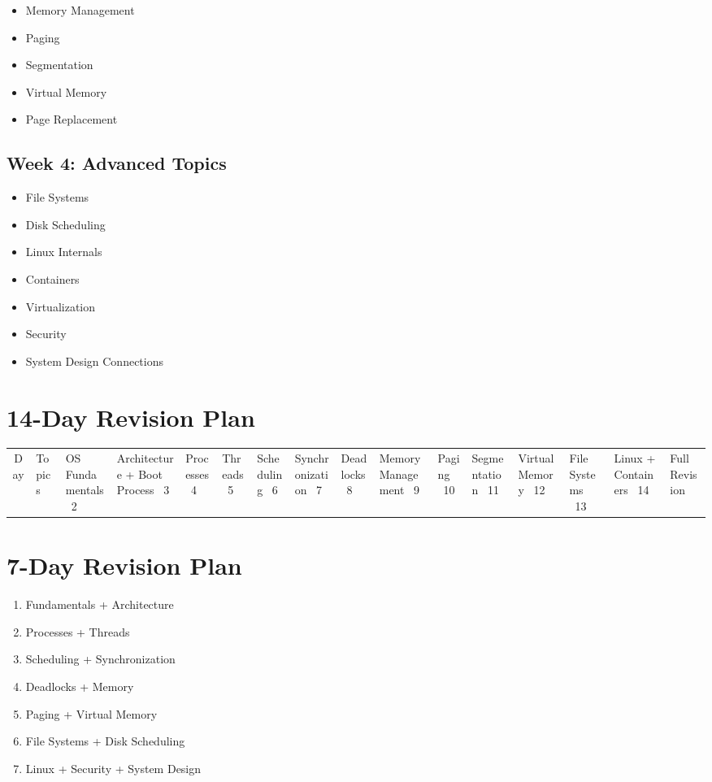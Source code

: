 \begin{itemize}
\item Memory Management
\item Paging
\item Segmentation
\item Virtual Memory
\item Page Replacement
\end{itemize}

\subsection*{Week 4: Advanced Topics}

\begin{itemize}
\item File Systems
\item Disk Scheduling
\item Linux Internals
\item Containers
\item Virtualization
\item Security
\item System Design Connections
\end{itemize}

\section{14-Day Revision Plan}

\begin{center}
\begin{tabular}{|c|l|}
\hline
Day & Topics \
 & OS Fundamentals \
2 & Architecture + Boot Process \
3 & Processes \
4 & Threads \
5 & Scheduling \
6 & Synchronization \
7 & Deadlocks \
8 & Memory Management \
9 & Paging \
10 & Segmentation \
11 & Virtual Memory \
12 & File Systems \
13 & Linux + Containers \
14 & Full Revision \
\hline
\end{tabular}
\end{center}

\section{7-Day Revision Plan}

\begin{enumerate}
\item Fundamentals + Architecture
\item Processes + Threads
\item Scheduling + Synchronization
\item Deadlocks + Memory
\item Paging + Virtual Memory
\item File Systems + Disk Scheduling
\item Linux + Security + System Design
\end{enumerate}


